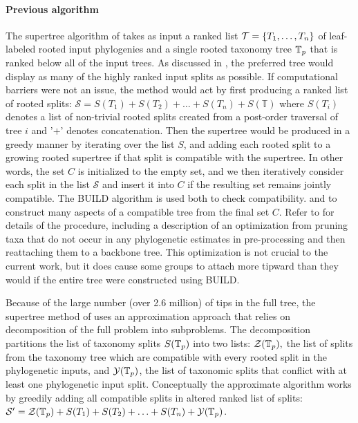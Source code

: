 \documentclass[english]{article}
\begin{document}
\paragraph{Previous algorithm}

The supertree algorithm of \citet{redelings2017supertree} takes as
input a ranked list $\mathcal{T}=\left\{ T_{1},\ldots,T_{n}\right\} $
of leaf-labeled rooted input phylogenies and a single rooted taxonomy
tree $\mbox{\ensuremath{\mathbb{T}}}_{p}$ that is ranked below all of the input trees.
As
discussed in \citet{redelings2017supertree}, the preferred tree would
display as many of the highly ranked input splits as possible.
If
computational barriers were not an issue, the method would act by
first producing a ranked list of rooted splits:
$\mathcal{S}=S(T_{1})+S(T_{2})+\ldots+S(T_{n})+S(\mathbb{T})$ where
$S(T_{i})$ denotes a list of non-trivial rooted splits created from a
post-order traversal of tree $i$ and '$+$' denotes concatenation.
Then
the supertree would be produced in a greedy manner by iterating over
the list $S$, and adding each rooted split to a growing rooted
supertree if that split is compatible with the supertree.
In other
words, the set $C$ is initialized to the empty set, and we then
iteratively consider each split in the list $\mathcal{S}$ and insert
it into $C$ if the resulting set remains jointly compatible.
The BUILD
algorithm \citep{AhoSSU1981} is used both to check compatibility.
 and to construct many aspects of a compatible tree from the final set $C$.
Refer to \citet{redelings2017supertree} for details of the procedure, including
a description of an optimization from
  pruning taxa that do not occur in any phylogenetic estimates in pre-processing
  and then reattaching them to a backbone tree.
This optimization is not crucial to the current work, but it does
  cause some groups to attach more tipward than they would if the entire
  tree were constructed using BUILD.

Because of the large number (over 2.6 million) of tips in the full
tree, the supertree method of \citet{redelings2017supertree} uses an
approximation approach that relies on decomposition of the full
problem into subproblems.
The decomposition partitions the list of
taxonomy splits $S(\mbox{\ensuremath{\mathbb{T}}}_{p})$ into two lists:
$\mathcal{Z}(\mbox{\ensuremath{\mathbb{T}}}_{p}),$ the list of splits from the taxonomy tree
which are compatible with every rooted split in the phylogenetic
inputs, and $\mathcal{Y}(\mbox{\ensuremath{\mathbb{T}}}_{p})$, the list of taxonomic splits
that conflict with at least one phylogenetic input split.
Conceptually
the approximate algorithm works by greedily adding all compatible
splits in altered ranked list of splits:
$\mathcal{S}^{\prime}=\mathcal{Z}(\mbox{\ensuremath{\mathbb{T}}}_{p})+S(T_{1})+S(T_{2})+\ldots+S(T_{n})+\mathcal{Y}(\mbox{\ensuremath{\mathbb{T}}}_{p})$.
\end{document}
